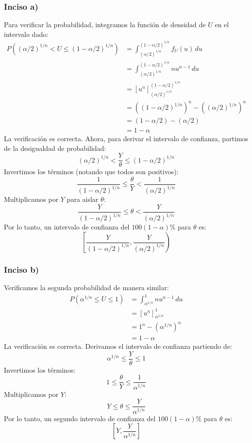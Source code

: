 \documentclass[12pt]{article}
\begin{document}
\subsubsection{Inciso a)}
Para verificar la probabilidad, integramos la función de densidad de $U$ en el intervalo dado:
$$
\begin{aligned}
P\left( (\alpha/2)^{1/n} < U \le (1 - \alpha/2)^{1/n} \right) &= \int_{(\alpha/2)^{1/n}}^{(1 - \alpha/2)^{1/n}} f_U(u) \, du \\
&= \int_{(\alpha/2)^{1/n}}^{(1 - \alpha/2)^{1/n}} n u^{n-1} \, du \\
&= \left[ u^n \right]_{(\alpha/2)^{1/n}}^{(1 - \alpha/2)^{1/n}} \\
&= \left( (1 - \alpha/2)^{1/n} \right)^n - \left( (\alpha/2)^{1/n} \right)^n \\
&= (1 - \alpha/2) - (\alpha/2) \\
&= 1 - \alpha
\end{aligned}
$$
La verificación es correcta. Ahora, para derivar el intervalo de confianza, partimos de la desigualdad de probabilidad:
$$ (\alpha/2)^{1/n} < \frac{Y}{\theta} \le (1 - \alpha/2)^{1/n} $$
Invertimos los términos (notando que todos son positivos):
$$ \frac{1}{(1 - \alpha/2)^{1/n}} \le \frac{\theta}{Y} < \frac{1}{(\alpha/2)^{1/n}} $$
Multiplicamos por $Y$ para aislar $\theta$:
$$ \frac{Y}{(1 - \alpha/2)^{1/n}} \le \theta < \frac{Y}{(\alpha/2)^{1/n}} $$
Por lo tanto, un intervalo de confianza del $100(1-\alpha)\%$ para $\theta$ es:
$$ \left[ \frac{Y}{(1 - \alpha/2)^{1/n}}, \frac{Y}{(\alpha/2)^{1/n}} \right) $$

\subsubsection{Inciso b)}
Verificamos la segunda probabilidad de manera similar:
$$
\begin{aligned}
P\left( \alpha^{1/n} \le U \le 1 \right) &= \int_{\alpha^{1/n}}^{1} n u^{n-1} \, du \\
&= \left[ u^n \right]_{\alpha^{1/n}}^{1} \\
&= 1^n - (\alpha^{1/n})^n \\
&= 1 - \alpha
\end{aligned}
$$
La verificación es correcta. Derivamos el intervalo de confianza partiendo de:
$$ \alpha^{1/n} \le \frac{Y}{\theta} \le 1 $$
Invertimos los términos:
$$ 1 \le \frac{\theta}{Y} \le \frac{1}{\alpha^{1/n}} $$
Multiplicamos por $Y$:
$$ Y \le \theta \le \frac{Y}{\alpha^{1/n}} $$
Por lo tanto, un segundo intervalo de confianza del $100(1-\alpha)\%$ para $\theta$ es:
$$ \left[ Y, \frac{Y}{\alpha^{1/n}} \right] $$
\end{document}
